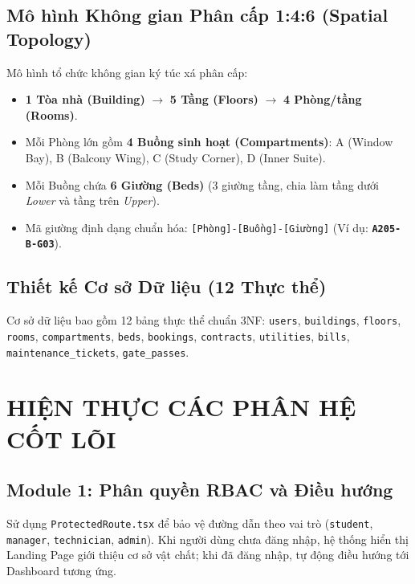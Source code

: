 \documentclass[12pt,a4paper,oneside]{report}
\begin{document}
\section{Mô hình Không gian Phân cấp 1:4:6 (Spatial Topology)}
Mô hình tổ chức không gian ký túc xá phân cấp:
\begin{itemize}
    \item \textbf{1 Tòa nhà (Building)} $\longrightarrow$ \textbf{5 Tầng (Floors)} $\longrightarrow$ \textbf{4 Phòng/tầng (Rooms)}.
    \item Mỗi Phòng lớn gồm \textbf{4 Buồng sinh hoạt (Compartments)}: A (Window Bay), B (Balcony Wing), C (Study Corner), D (Inner Suite).
    \item Mỗi Buồng chứa \textbf{6 Giường (Beds)} (3 giường tầng, chia làm tầng dưới \textit{Lower} và tầng trên \textit{Upper}).
    \item Mã giường định dạng chuẩn hóa: \texttt{[Phòng]-[Buồng]-[Giường]} (Ví dụ: \textbf{\texttt{A205-B-G03}}).
\end{itemize}

\section{Thiết kế Cơ sở Dữ liệu (12 Thực thể)}
Cơ sở dữ liệu bao gồm 12 bảng thực thể chuẩn 3NF: \texttt{users}, \texttt{buildings}, \texttt{floors}, \texttt{rooms}, \texttt{compartments}, \texttt{beds}, \texttt{bookings}, \texttt{contracts}, \texttt{utilities}, \texttt{bills}, \texttt{maintenance\_tickets}, \texttt{gate\_passes}.

\chapter{HIỆN THỰC CÁC PHÂN HỆ CỐT LÕI}
\label{ch:core_modules}

\section{Module 1: Phân quyền RBAC và Điều hướng}
Sử dụng \texttt{ProtectedRoute.tsx} để bảo vệ đường dẫn theo vai trò (\texttt{student}, \texttt{manager}, \texttt{technician}, \texttt{admin}). Khi người dùng chưa đăng nhập, hệ thống hiển thị Landing Page giới thiệu cơ sở vật chất; khi đã đăng nhập, tự động điều hướng tới Dashboard tương ứng.
\end{document}
